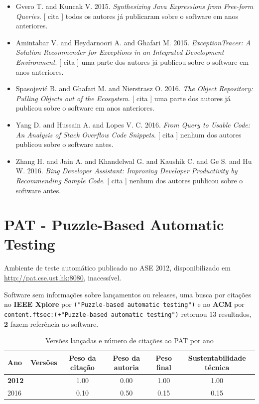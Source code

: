 \begin{itemize}
\item Gvero T. and Kuncak V.
      2015.
        \textit{ Synthesizing Java Expressions from Free-form Queries}.
      [
          cita
      ]
todos os autores já publicaram sobre o software em anos anteriores.
\item Amintabar V. and Heydarnoori A. and Ghafari M.
      2015.
        \textit{ ExceptionTracer: A Solution Recommender for Exceptions in an Integrated Development Environment}.
      [
          cita
      ]
uma parte dos autores já publicou sobre o software em anos anteriores.
\item Spasojevi\'{c} B. and Ghafari M. and Nierstrasz O.
      2016.
        \textit{ The Object Repository: Pulling Objects out of the Ecosystem}.
      [
          cita
      ]
uma parte dos autores já publicou sobre o software em anos anteriores.
\item Yang D. and Hussain A. and Lopes V. C.
      2016.
        \textit{ From Query to Usable Code: An Analysis of Stack Overflow Code Snippets}.
      [
          cita
      ]
nenhum dos autores publicou sobre o software antes.
\item Zhang H. and Jain A. and Khandelwal G. and Kaushik C. and Ge S. and Hu W.
      2016.
        \textit{ Bing Developer Assistant: Improving Developer Productivity by Recommending Sample Code}.
      [
          cita
      ]
nenhum dos autores publicou sobre o software antes.
\end{itemize}
\section{PAT - Puzzle-Based Automatic Testing}

Ambiente de teste automático
publicado no ASE 2012,
disponibilizado em \url{http://pat.cse.ust.hk:8080},
inacessível.

Software sem informações sobre lançamentos ou releases,
uma busca por citações no {\bf IEEE Xplore} por
\texttt{("Puzzle-based automatic testing")}
e no {\bf ACM} por
\texttt{content.ftsec:(+"Puzzle-based automatic testing")}
retornou
13 resultados,
{\bf 2} fazem referência ao software.


\begin{table}[H]
\caption{Versões lançadas e número de citações ao PAT por ano}
\centering
\begin{tabular}{| l | c | c | c | c | c |}
  \hline
  Ano & Versões & Peso da citação & Peso da autoria & Peso final & Sustentabilidade técnica \\
  \hline
            {\bf 2012}
          &
          
          &
          1.00
          &
          0.00
          &
          1.00
          &
            {\color{blue} 1.00}
          \\
\hline
            2016
          &
          
          &
          0.10
          &
          0.50
          &
          0.15
          &
            {\color{red} 0.15}
          \\
\hline
\end{tabular}
\end{table}

